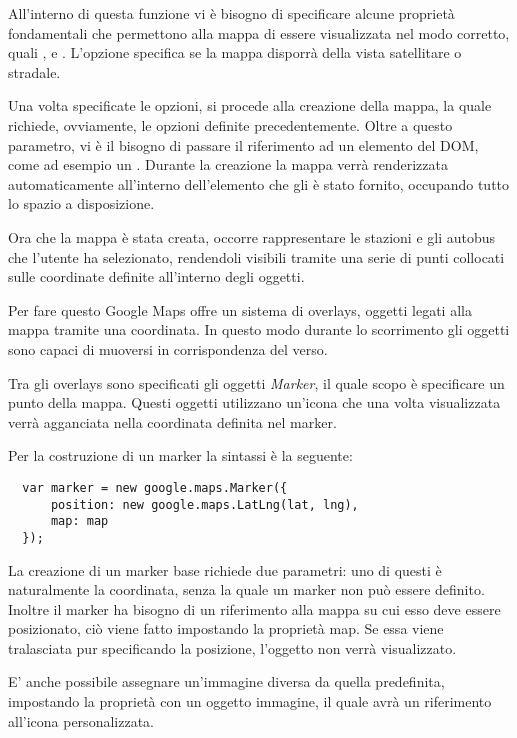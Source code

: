 All'interno di questa funzione vi è bisogno di specificare alcune proprietà fondamentali che permettono alla mappa di essere visualizzata nel modo corretto, quali ,  e .
L'opzione  specifica se la mappa disporrà della vista satellitare o stradale.

Una volta specificate le opzioni, si procede alla creazione della mappa, la quale richiede, ovviamente, le opzioni definite precedentemente. Oltre a questo parametro, vi è il bisogno di passare il riferimento ad un elemento del DOM, come ad esempio un .
Durante la creazione la mappa verrà renderizzata automaticamente all'interno dell'elemento che gli è stato fornito, occupando tutto lo spazio a disposizione.
\vspace{0.5cm}

Ora che la mappa è stata creata, occorre rappresentare le stazioni e gli autobus che l'utente ha selezionato, rendendoli visibili tramite una serie di punti collocati sulle coordinate definite all'interno degli oggetti.

Per fare questo Google Maps offre un sistema di overlays, oggetti legati alla mappa tramite una coordinata. In questo modo durante lo scorrimento gli oggetti sono capaci di muoversi in corrispondenza del verso.

Tra gli overlays sono specificati gli oggetti {\itshape Marker}, il quale scopo è specificare un punto della mappa. Questi oggetti utilizzano un'icona che una volta visualizzata verrà agganciata nella coordinata definita nel marker.

Per la costruzione di un marker la sintassi è la seguente:

\begin{lstlisting}
  var marker = new google.maps.Marker({
      position: new google.maps.LatLng(lat, lng),
      map: map
  });
\end{lstlisting}

La creazione di un marker base richiede due parametri: uno di questi è naturalmente la coordinata, senza la quale un marker non può essere definito. Inoltre il marker ha bisogno di un riferimento alla mappa su cui esso deve essere posizionato, ciò viene fatto impostando la proprietà map. Se essa viene tralasciata pur specificando la posizione, l'oggetto non verrà visualizzato.

E' anche possibile assegnare un'immagine diversa da quella predefinita, impostando la proprietà  con un oggetto immagine, il quale avrà un riferimento all'icona personalizzata.
\vspace{0.5cm}

